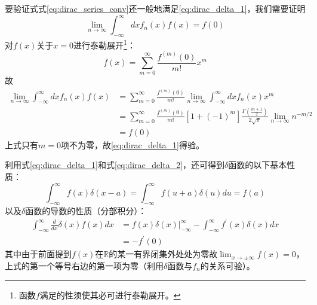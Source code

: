 \documentclass[main.tex]{subfiles}
\begin{document}
要验证式式\eqref{eq:dirac_series_conv}还一般地满足\eqref{eq:dirac_delta_1}，我们需要证明
\[\lim_{n\to\infty}\int_{-\infty}^\infty dxf_n\left(x\right)f\left(x\right)=f\left(0\right)\]
对$f\left(x\right)$关于$x=0$进行泰勒展开\footnote{函数$f$满足的性须使其必可进行泰勒展开。}：
\[f\left(x\right)=\sum_{m=0}^\infty\frac{f^{\left(m\right)}\left(0\right)}{m!}x^m\]
故
\begin{align*}
    \lim_{n\to\infty}\int_{-\infty}^\infty dxf_n\left(x\right)f\left(x\right) & =\sum_{m=0}^\infty\frac{f^{\left(m\right)}\left(0\right)}{m!}\lim_{n\to\infty}\int_{-\infty}^\infty dxf_n\left(x\right)x^m                                                 \\
                                                                              & =\sum_{m=0}^\infty\frac{f^{\left(m\right)}\left(0\right)}{m!}\left[1+\left(-1\right)^m\right]\frac{\Gamma\left(\frac{m+1}{2}\right)}{2\sqrt{\pi}}\lim_{n\to\infty}n^{-m/2} \\
                                                                              & =f\left(0\right)
\end{align*}
上式只有$m=0$项不为零，故\eqref{eq:dirac_delta_1}得验。

利用式\eqref{eq:dirac_delta_1}和式\eqref{eq:dirac_delta_2}，还可得到$\delta$函数的以下基本性质：
\begin{equation}\label{eq:delta_offset}
    \int_{-\infty}^\infty f\left(x\right)\delta\left(x-a\right)=\int_{-\infty}^\infty f\left(u+a\right)\delta\left(u\right)du=f\left(a\right)
\end{equation}
以及$\delta$函数的导数的性质（分部积分）：
\begin{align}\label{eq:delta_derivative}
    \int_{-\infty}^\infty\frac{d}{dx}\delta\left(x\right)f\left(x\right)dx & =\left.f\left(x\right)\delta\left(x\right)\right|_{-\infty}^\infty-\int_{-\infty}^\infty f^\prime\left(x\right)\delta\left(x\right)dx\nonumber \\
                                                                           & =-f^\prime\left(0\right)
\end{align}
其中由于前面提到$f\left(x\right)$在$\mathbb{R}$的某一有界闭集外处处为零故$\lim_{x\to\pm\infty}f\left(x\right)=0$，上式的第一个等号右边的第一项为零（利用$\delta$函数与$f_n$的关系可验）。
\end{document}
